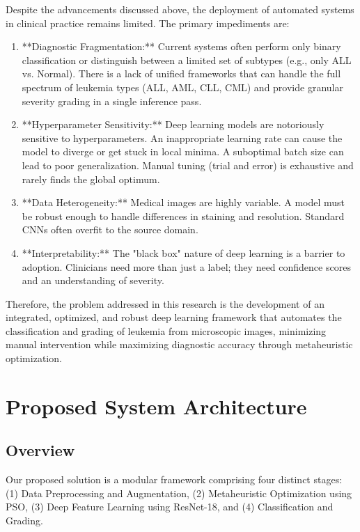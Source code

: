 \documentclass[journal]{IEEEtran}
\begin{document}
Despite the advancements discussed above, the deployment of automated systems in clinical practice remains limited. The primary impediments are:

\begin{enumerate}
    \item **Diagnostic Fragmentation:** Current systems often perform only binary classification or distinguish between a limited set of subtypes (e.g., only ALL vs. Normal). There is a lack of unified frameworks that can handle the full spectrum of leukemia types (ALL, AML, CLL, CML) and provide granular severity grading in a single inference pass.
    
    \item **Hyperparameter Sensitivity:** Deep learning models are notoriously sensitive to hyperparameters. An inappropriate learning rate can cause the model to diverge or get stuck in local minima. A suboptimal batch size can lead to poor generalization. Manual tuning (trial and error) is exhaustive and rarely finds the global optimum.
    
    \item **Data Heterogeneity:** Medical images are highly variable. A model must be robust enough to handle differences in staining and resolution. Standard CNNs often overfit to the source domain.
    
    \item **Interpretability:** The "black box" nature of deep learning is a barrier to adoption. Clinicians need more than just a label; they need confidence scores and an understanding of severity.
\end{enumerate}

Therefore, the problem addressed in this research is the development of an integrated, optimized, and robust deep learning framework that automates the classification and grading of leukemia from microscopic images, minimizing manual intervention while maximizing diagnostic accuracy through metaheuristic optimization.

\section{Proposed System Architecture}

\subsection{Overview}
Our proposed solution is a modular framework comprising four distinct stages: (1) Data Preprocessing and Augmentation, (2) Metaheuristic Optimization using PSO, (3) Deep Feature Learning using ResNet-18, and (4) Classification and Grading.
\end{document}
